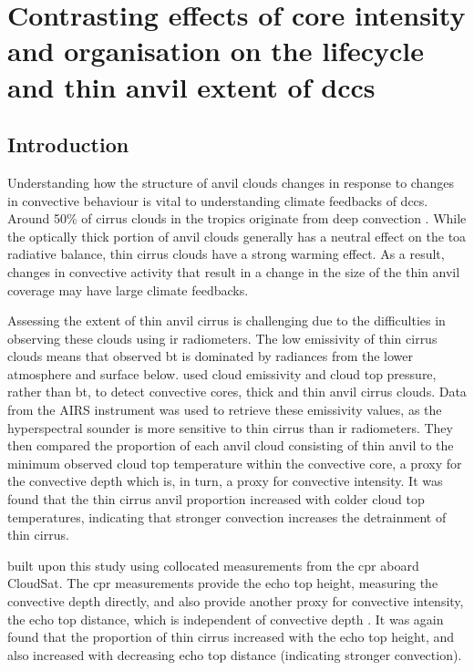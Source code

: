 \chapter{Contrasting effects of core intensity and organisation on the lifecycle and thin anvil extent of \acrshort{dcc}s} \label{sec:anvil_structure}

\section{Introduction}

Understanding how the structure of anvil clouds changes in response to changes in convective behaviour is vital to understanding climate feedbacks of \acrshort{dcc}s.
Around 50\% of cirrus clouds in the tropics originate from deep convection \citep{massie_distribution_2002, luo_characterizing_2004}.
While the optically thick portion of anvil clouds generally has a neutral effect on the \acrshort{toa} radiative balance, thin cirrus clouds have a strong warming effect.
As a result, changes in convective activity that result in a change in the size of the thin anvil coverage may have large climate feedbacks.

Assessing the extent of thin anvil cirrus is challenging due to the difficulties in observing these clouds using \acrshort{ir} radiometers.
The low emissivity of thin cirrus clouds means that observed \acrshort{bt} is dominated by radiances from the lower atmosphere and surface below.
\citet{protopapadaki_upper_2017} used cloud emissivity and cloud top pressure, rather than \acrshort{bt}, to detect convective cores, thick and thin anvil cirrus clouds.
Data from the AIRS instrument was used to retrieve these emissivity values, as the hyperspectral sounder is more sensitive to thin cirrus than \acrshort{ir} radiometers.
They then compared the proportion of each anvil cloud consisting of thin anvil to the minimum observed cloud top temperature within the convective core, a proxy for the convective depth which is, in turn, a proxy for convective intensity.
It was found that the thin cirrus anvil proportion increased with colder cloud top temperatures, indicating that stronger convection increases the detrainment of thin cirrus.

\citet{takahashi_relationships_2017} built upon this study using collocated measurements from the \acrfull{cpr} aboard CloudSat.
The \acrshort{cpr} measurements provide the echo top height, measuring the convective depth directly, and also provide another proxy for convective intensity, the echo top distance, which is independent of convective depth \citep{takahashi_characterizing_2014}.
It was again found that the proportion of thin cirrus increased with the echo top height, and also increased with decreasing echo top distance (indicating stronger convection).

